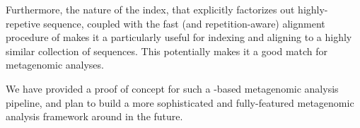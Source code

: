 Furthermore, the nature of the \pufferfish index, that explicitly
factorizes out highly-repetive sequence, coupled with the fast (and
repetition-aware) alignment procedure of \puffaligner makes it a
particularly useful for indexing and aligning to a highly similar
collection of sequences. This potentially makes it a good match 
for metagenomic analyses.

We have provided a proof of concept for such a \puffaligner-based
metagenomic analysis pipeline, and plan to build a more sophisticated 
and fully-featured metagenomic analysis framework around \puffaligner 
in the future. 